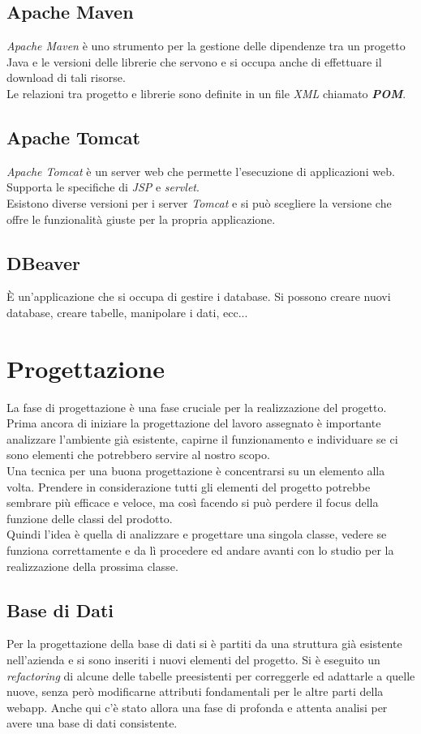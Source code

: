 \subsection*{Apache Maven}
\textit{Apache Maven} è uno strumento per la gestione delle dipendenze tra un progetto Java e le versioni delle librerie che servono e si occupa anche di effettuare il download di tali risorse. \\
Le relazioni tra progetto e librerie sono definite in un file \textit{XML} chiamato \textit{\textbf{POM}}.

\subsection*{Apache Tomcat}
\textit{Apache Tomcat} è un server web che permette l'esecuzione di applicazioni web. Supporta le specifiche di \textit{JSP} e \textit{servlet}.\\
Esistono diverse versioni per i server \textit{Tomcat} e si può scegliere la versione che offre le funzionalità giuste per la propria applicazione.
\subsection*{DBeaver}
È un'applicazione che si occupa di gestire i database. Si possono creare nuovi database, creare tabelle, manipolare i dati, ecc...

\section{Progettazione}
\label{sec:progettazione}
La fase di progettazione è una fase cruciale per la realizzazione del progetto. Prima ancora di iniziare la progettazione del lavoro assegnato è importante analizzare l'ambiente già esistente, capirne il funzionamento e individuare se ci sono elementi che potrebbero servire al nostro scopo. \\
Una tecnica per una buona progettazione è concentrarsi su un elemento alla volta. Prendere in considerazione tutti gli elementi del progetto potrebbe sembrare più efficace e veloce, ma così facendo si può perdere il focus della funzione delle classi del prodotto.\\ 
Quindi l'idea è quella di analizzare e progettare una singola classe, vedere se funziona correttamente e da lì procedere ed andare avanti con lo studio per la realizzazione della prossima classe.




\subsection{Base di Dati}
Per la progettazione della base di dati si è partiti da una struttura già esistente nell'azienda e si sono inseriti i nuovi elementi del progetto. Si è eseguito un \textit{refactoring} di alcune delle tabelle preesistenti per correggerle ed adattarle a quelle nuove, senza però modificarne attributi fondamentali per le altre parti della webapp. Anche qui c'è stato allora una fase di profonda e attenta analisi per avere una base di dati consistente. 
